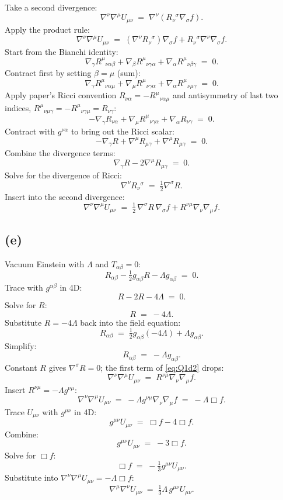 \documentclass[11pt]{article}
\begin{document}
Take a second divergence:
\[
\nabla^\nu\nabla^\mu U_{\mu\nu} \;=\; \nabla^\nu\!\left(R_\nu{}^\sigma\nabla_\sigma f\right).
\]
Apply the product rule:
\[
\nabla^\nu\nabla^\mu U_{\mu\nu} \;=\; (\nabla^\nu R_\nu{}^\sigma)\nabla_\sigma f + R_\nu{}^\sigma\nabla^\nu\nabla_\sigma f.
\]
Start from the Bianchi identity:
\[
\nabla_\gamma R^\mu{}_{\nu\alpha\beta}+\nabla_\beta R^\mu{}_{\nu\gamma\alpha}+\nabla_\alpha R^\mu{}_{\nu\beta\gamma} \;=\; 0.
\]
Contract first by setting $\beta=\mu$ (sum):
\[
\nabla_\gamma R^\mu{}_{\nu\alpha\mu}+\nabla_\mu R^\mu{}_{\nu\gamma\alpha}+\nabla_\alpha R^\mu{}_{\nu\mu\gamma} \;=\; 0.
\]
Apply paper's Ricci convention $R_{\nu\alpha}=-R^\mu{}_{\nu\alpha\mu}$ and antisymmetry of last two indices, $R^\mu{}_{\nu\mu\gamma}=-R^\mu{}_{\nu\gamma\mu}=R_{\nu\gamma}$:
\[
-\nabla_\gamma R_{\nu\alpha}+\nabla_\mu R^\mu{}_{\nu\gamma\alpha}+\nabla_\alpha R_{\nu\gamma} \;=\; 0.
\]
Contract with $g^{\nu\alpha}$ to bring out the Ricci scalar:
\[
-\nabla_\gamma R+\nabla^\mu R_{\mu\gamma}+\nabla^\mu R_{\mu\gamma} \;=\; 0.
\]
Combine the divergence terms:
\[
\nabla_\gamma R - 2\nabla^\mu R_{\mu\gamma} \;=\; 0.
\]
Solve for the divergence of Ricci:
\[
\nabla^\nu R_\nu{}^\sigma \;=\; \tfrac12\nabla^\sigma R.
\]
Insert into the second divergence:
\begin{equation}
\boxed{\;\nabla^\nu\nabla^\mu U_{\mu\nu} \;=\; \tfrac12\,\nabla^\sigma R\,\nabla_\sigma f + R^{\nu\mu}\nabla_\nu\nabla_\mu f.\;}
\label{eq:Q1d2}
\end{equation}

\subsection*{(e)}

Vacuum Einstein with $\Lambda$ and $T_{\alpha\beta}=0$:
\[
R_{\alpha\beta}-\tfrac12 g_{\alpha\beta}R-\Lambda g_{\alpha\beta} \;=\; 0.
\]
Trace with $g^{\alpha\beta}$ in 4D:
\[
R - 2R - 4\Lambda \;=\; 0.
\]
Solve for $R$:
\[
R \;=\; -4\Lambda.
\]
Substitute $R=-4\Lambda$ back into the field equation:
\[
R_{\alpha\beta} \;=\; \tfrac12 g_{\alpha\beta}(-4\Lambda) + \Lambda g_{\alpha\beta}.
\]
Simplify:
\[
R_{\alpha\beta} \;=\; -\Lambda g_{\alpha\beta}.
\]
Constant $R$ gives $\nabla^\sigma R=0$; the first term of \eqref{eq:Q1d2} drops:
\[
\nabla^\nu\nabla^\mu U_{\mu\nu} \;=\; R^{\nu\mu}\nabla_\nu\nabla_\mu f.
\]
Insert $R^{\nu\mu}=-\Lambda g^{\nu\mu}$:
\[
\nabla^\nu\nabla^\mu U_{\mu\nu} \;=\; -\Lambda g^{\nu\mu}\nabla_\nu\nabla_\mu f \;=\; -\Lambda\Box f.
\]
Trace $U_{\mu\nu}$ with $g^{\mu\nu}$ in 4D:
\[
g^{\mu\nu}U_{\mu\nu} \;=\; \Box f - 4\Box f.
\]
Combine:
\[
g^{\mu\nu}U_{\mu\nu} \;=\; -3\Box f.
\]
Solve for $\Box f$:
\[
\Box f \;=\; -\tfrac{1}{3}g^{\mu\nu}U_{\mu\nu}.
\]
Substitute into $\nabla^\nu\nabla^\mu U_{\mu\nu}=-\Lambda\Box f$:
\begin{equation}
\boxed{\;\nabla^\mu\nabla^\nu U_{\mu\nu} \;=\; \tfrac{1}{3}\Lambda\,g^{\mu\nu}U_{\mu\nu}.\;}
\label{eq:Q1e}
\end{equation}
\end{document}
